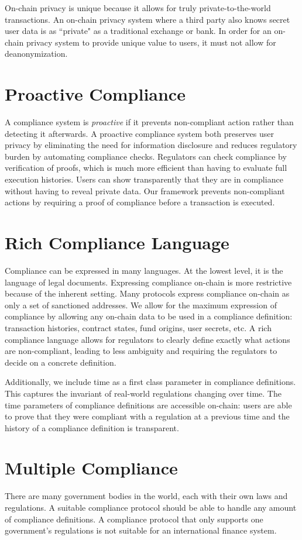 \documentclass[9pt]{extreport}
\begin{document}
On-chain privacy is unique because it allows for truly private-to-the-world transactions.  An on-chain privacy system where a third party also knows secret user data is as ``private" as a traditional exchange or bank.  In order for an on-chain privacy system to provide unique value to users, it must not allow for deanonymization.

\section{Proactive Compliance} A compliance system is \textit{proactive} if it prevents non-compliant action rather than detecting it afterwards. A proactive compliance system both preserves user privacy by eliminating the need for information disclosure and reduces regulatory burden by automating compliance checks.  Regulators can check compliance by verification of proofs, which is much more efficient than having to evaluate full execution histories.  Users can show transparently that they are in compliance without having to reveal private data.  Our framework prevents non-compliant actions by requiring a proof of compliance before a transaction is executed.  

\section{Rich Compliance Language} Compliance can be expressed in many languages.  At the lowest level, it is the language of legal documents.  Expressing compliance on-chain is more restrictive because of the inherent setting.  Many protocols express compliance on-chain as only a set of sanctioned addresses.  We allow for the maximum expression of compliance by allowing any on-chain data to be used in a compliance definition: transaction histories, contract states, fund origins, user secrets, etc.  A rich compliance language allows for regulators to clearly define exactly what actions are non-compliant, leading to less ambiguity and requiring the regulators to decide on a concrete definition.

Additionally, we include time as a first class parameter in compliance definitions.  This captures the invariant of real-world regulations changing over time.  The time parameters of compliance definitions are accessible on-chain: users are able to prove that they were compliant with a regulation at a previous time and the history of a compliance definition is transparent.

\section{Multiple Compliance} There are many government bodies in the world, each with their own laws and regulations.  A suitable compliance protocol should be able to handle any amount of compliance definitions.  A compliance protocol that only supports one government's regulations is not suitable for an international finance system.
\end{document}
